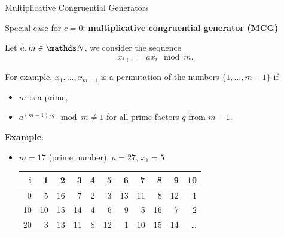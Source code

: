 \documentclass[11pt,compress,t,notes=noshow, xcolor=table]{beamer}
\begin{document}
\begin{vbframe}{Multiplicative Congruential Generators}

Special case for $c = 0$: \textbf{multiplicative congruential generator (MCG)}

\lz

Let $a, m \in\N$,  we consider the sequence
$$
  x_{i+1} = a x_i \mod m.
$$

\medskip

For example, $x_1, \ldots, x_{m-1}$ is a permutation of the numbers $\{1, \ldots, m-1\}$ if
\begin{itemize}
\item $m$ is a prime,
\item $a^{(m - 1) / q} \mod m \not= 1$ for all prime factors $q$ from $m-1$.
\end{itemize}

\framebreak


\textbf{Example}:

\begin{itemize}
\item $m=17$ (prime number), $a=27$, $x_1 = 5$
%
%
%
%


\begin{table}
\begin{footnotesize}
\centering
\begin{tabular}{r|rrrrrrrrrr}
  \hline
i & 1 & 2 & 3 & 4 & 5 & 6 & 7 & 8 & 9 & 10 \\
  \hline
0  & \cellcolor{orange}5 & 16 & 7 & 2 & 3 & 13 & 11 & 8 & 12 & 1 \\
10 & 10 & 15 & 14 & 4 & 6 & 9 & \cellcolor{orange}5 & 16 & 7 & 2 \\
20 & 3 & 13 & 11 & 8 & 12 & 1 & 10 & 15 & 14 &  \ldots \\
\hline
\end{tabular}
\end{footnotesize}
\end{table}


\end{itemize}
\end{vbframe}
\end{document}
